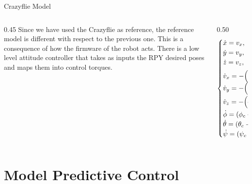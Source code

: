 \documentclass{beamer}
\begin{document}
\begin{frame}{Crazyflie Model}
    \begin{columns}[T] %
        \begin{column}{0.45\textwidth}
            \vspace{0.7cm}
            Since we have used the Crazyflie as reference, the reference
            model is different with respect to the previous one. This is a
            consequence of how the firmware of the robot acts. There is a
            low level attitude controller that takes as inputs the RPY
            desired poses and maps them into control torques.
        \end{column}
        
        \begin{column}{0.50\textwidth}
            \vspace{-1.0cm}
            \begin{align}
                \begin{cases}
                    \dot{x} = v_{x}, \\
                    \dot{y} = v_{y}, \\
                    \dot{z} = v_{z}, \\[1ex]
                    \dot{v}_{x} = -\Bigl(\cos\psi\, \sin\theta\, \cos\phi + \sin\psi\, \sin\phi\Bigr)\frac{T}{m}, \\
                    \dot{v}_{y} = -\Bigl(\sin\psi\, \sin\theta\, \cos\phi - \cos\psi\, \sin\phi\Bigr)\frac{T}{m}, \\
                    \dot{v}_{z} = -\Bigl(\cos\theta\, \cos\phi\Bigr)\dfrac{T}{m} + g, \\[1ex]
                    \dot{\phi} = ({\phi_{c} - \phi})/{\tau} \\
                    \dot{\theta} = ({\theta_{c} - \theta})/{\tau} \\
                    \dot{\psi} = ({\psi_{c} - \psi})/{\tau} 
                \end{cases}
            \end{align}
        \end{column}
    \end{columns}
\end{frame}

\section{Model Predictive Control}
\end{document}
